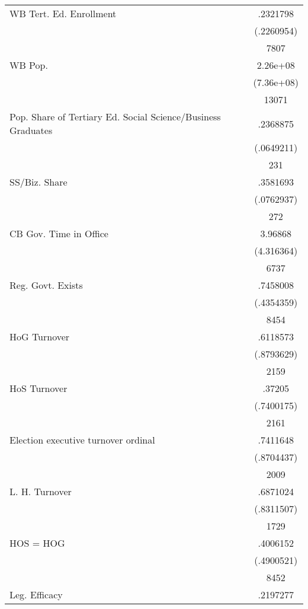 {\begin{longtable}{l*{1}{c}}
WB Tert. Ed. Enrollment&    .2321798\\
                    &  (.2260954)\\
                    &        7807\\
WB Pop.             &    2.26e+08\\
                    &  (7.36e+08)\\
                    &       13071\\
Pop. Share of Tertiary Ed. Social Science/Business Graduates&    .2368875\\
                    &  (.0649211)\\
                    &         231\\
SS/Biz. Share       &    .3581693\\
                    &  (.0762937)\\
                    &         272\\
CB Gov. Time in Office&     3.96868\\
                    &  (4.316364)\\
                    &        6737\\
Reg. Govt. Exists   &    .7458008\\
                    &  (.4354359)\\
                    &        8454\\
HoG Turnover        &    .6118573\\
                    &  (.8793629)\\
                    &        2159\\
HoS Turnover        &      .37205\\
                    &  (.7400175)\\
                    &        2161\\
Election executive turnover ordinal&    .7411648\\
                    &  (.8704437)\\
                    &        2009\\
L. H. Turnover      &    .6871024\\
                    &  (.8311507)\\
                    &        1729\\
HOS = HOG           &    .4006152\\
                    &  (.4900521)\\
                    &        8452\\
Leg. Efficacy       &    .2197277\\

\end{longtable}}
